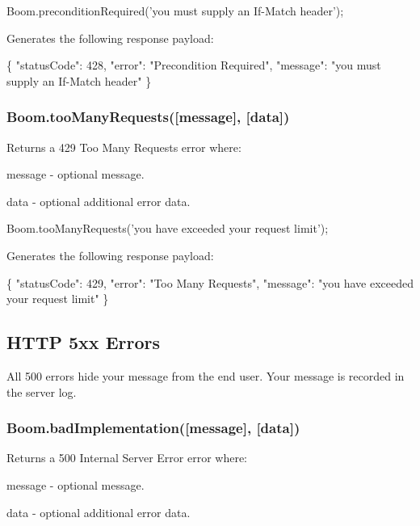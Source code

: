 \begin{DoxyCode}
Boom.preconditionRequired('you must supply an If-Match header');
\end{DoxyCode}


Generates the following response payload\+:


\begin{DoxyCode}
\{
    "statusCode": 428,
    "error": "Precondition Required",
    "message": "you must supply an If-Match header"
\}
\end{DoxyCode}


\subsubsection*{{\ttfamily Boom.\+too\+Many\+Requests(\mbox{[}message\mbox{]}, \mbox{[}data\mbox{]})}}

Returns a 429 Too Many Requests error where\+:
\begin{DoxyItemize}
\item {\ttfamily message} -\/ optional message.
\item {\ttfamily data} -\/ optional additional error data.
\end{DoxyItemize}


\begin{DoxyCode}
Boom.tooManyRequests('you have exceeded your request limit');
\end{DoxyCode}


Generates the following response payload\+:


\begin{DoxyCode}
\{
    "statusCode": 429,
    "error": "Too Many Requests",
    "message": "you have exceeded your request limit"
\}
\end{DoxyCode}


\subsection*{H\+T\+TP 5xx Errors}

All 500 errors hide your message from the end user. Your message is recorded in the server log.

\subsubsection*{{\ttfamily Boom.\+bad\+Implementation(\mbox{[}message\mbox{]}, \mbox{[}data\mbox{]})}}

Returns a 500 Internal Server Error error where\+:
\begin{DoxyItemize}
\item {\ttfamily message} -\/ optional message.
\item {\ttfamily data} -\/ optional additional error data.
\end{DoxyItemize}


